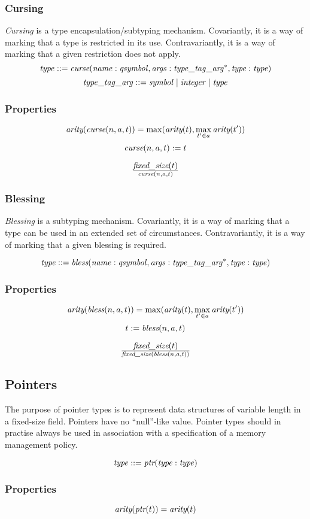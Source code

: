 \documentclass[a4paper]{report}
\newcommand\arity{{\ensuremath\textit{arity}}}
\newcommand\fixedsize{{\ensuremath\textit{fixed\_size}}}
\newcommand\tyBless{{\ensuremath\textit{bless}}}
\newcommand\tyCurse{{\ensuremath\textit{curse}}}
\newcommand\tyPtr{{\ensuremath\textit{ptr}}}
\begin{document}
\subsubsection{Cursing}
\emph{Cursing} is a type encapsulation/subtyping mechanism.
Covariantly, it is a way of marking that a type is restricted in its use.
Contravariantly, it is a way of marking that a given restriction does not apply.
$$
\it type ::= \tyCurse(name : qsymbol, args : type\_tag\_arg^*, type : type)
$$
$$
\it type\_tag\_arg ::= symbol \;|\; integer \;|\; type
$$

\subsubsection*{Properties}
$$
\arity(\tyCurse(n,a,t)) = \max(\arity(t), \max_{t' \in a} \arity(t'))
$$
$$
\tyCurse(n,a,t) := t
$$

$$\fixedsize(t) \over \tyCurse(n,a,t)$$

\subsubsection{Blessing}
\emph{Blessing} is a subtyping mechanism.
Covariantly, it is a way of marking that a type can be used in an
extended set of circumstances.
Contravariantly, it is a way of marking that a given blessing is required.

$$
\it type ::= \tyBless(name : qsymbol, args : type\_tag\_arg^*, type : type)
$$

\subsubsection*{Properties}
$$
\arity(\tyBless(n,a,t)) = \max(\arity(t), \max_{t' \in a} \arity(t'))
$$
$$
t := \tyBless(n,a,t)
$$

$$\fixedsize(t) \over \fixedsize(\tyBless(n,a,t))$$

\subsection{Pointers}
The purpose of pointer types is to represent data structures of variable length
in a fixed-size field.
Pointers have no ``null''-like value. Pointer types should in practise
always be used in association with a specification of a memory management
policy.

$$\it type ::= \tyPtr(type : type)$$

\subsubsection*{Properties}
$$ \arity(\tyPtr(t)) = \arity(t)$$
\end{document}

